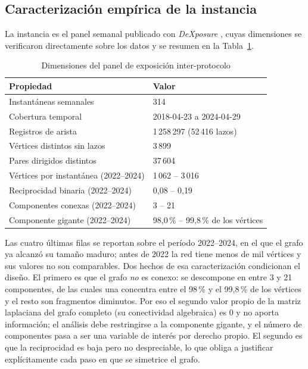 \documentclass[journal]{IEEEtran}
\begin{document}
\subsection{Caracterización empírica de la instancia}

La instancia es el panel semanal
publicado con \emph{DeXposure} \cite{wu2025dexposure}, cuyas dimensiones se
verificaron directamente sobre los datos y se resumen en la Tabla~\ref{tab:datos}.

\begin{table}[!t]
\renewcommand{\arraystretch}{1.25}
\caption{Dimensiones del panel de exposición inter-protocolo}
\label{tab:datos}
\centering
\setlength{\tabcolsep}{5pt}
\begin{tabular}{ll}
\toprule
\textbf{Propiedad} & \textbf{Valor} \\
\midrule
Instantáneas semanales      & 314 \\
Cobertura temporal          & 2018-04-23 a 2024-04-29 \\
Registros de arista         & 1\,258\,297 (52\,416 lazos) \\
Vértices distintos sin lazos & 3\,899 \\
Pares dirigidos distintos   & 37\,604 \\
Vértices por instantánea (2022--2024) & 1\,062 -- 3\,016 \\
Reciprocidad binaria (2022--2024) & 0{,}08 -- 0{,}19 \\
Componentes conexas (2022--2024)  & 3 -- 21 \\
Componente gigante (2022--2024)   & 98{,}0\,\% -- 99{,}8\,\% de los vértices \\
\bottomrule
\end{tabular}
\end{table}

Las cuatro últimas filas se reportan sobre el período 2022--2024, en el que el
grafo ya alcanzó su tamaño maduro; antes de 2022 la red tiene menos de mil
vértices y sus valores no son comparables.
Dos hechos de esa caracterización
condicionan el diseño. El primero es que el grafo \emph{no} es conexo: se
descompone en entre 3 y 21 componentes, de las cuales una concentra entre el
98\,\% y el 99{,}8\,\% de los vértices y el resto son fragmentos diminutos. Por eso el segundo valor propio de
la matriz laplaciana del grafo completo (su conectividad algebraica) es 0 y no
aporta información; el análisis debe restringirse a la componente gigante, y el número de
componentes pasa a ser una variable de interés por derecho propio. El segundo es
que la reciprocidad es baja pero no despreciable, lo que obliga a justificar
explícitamente cada paso en que se simetrice el grafo.
\end{document}
